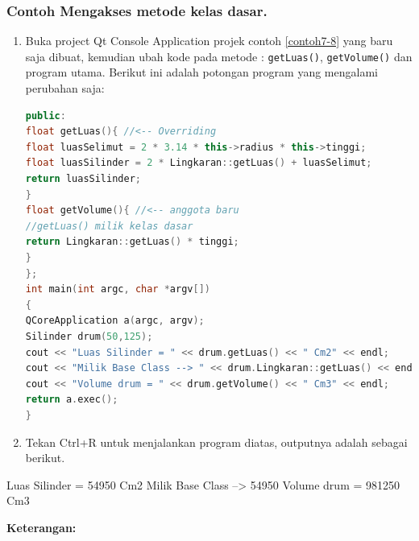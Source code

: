 \subsubsection*{Contoh  Mengakses metode kelas dasar.}

\begin{enumerate}

\item
  Buka project Qt Console Application projek contoh \ref{contoh7-8} yang baru saja
  dibuat, kemudian ubah kode pada metode : \texttt{getLuas()},
  \texttt{getVolume()} dan program utama. Berikut ini adalah potongan
  program yang mengalami perubahan saja:

\begin{lstlisting}[language=c++, caption=Mengakses metode kelas dasar, label=contoh7-8]
public:
float getLuas(){ //<-- Overriding
float luasSelimut = 2 * 3.14 * this->radius * this->tinggi;
float luasSilinder = 2 * Lingkaran::getLuas() + luasSelimut;
return luasSilinder;
}
float getVolume(){ //<-- anggota baru
//getLuas() milik kelas dasar
return Lingkaran::getLuas() * tinggi;
}
};
int main(int argc, char *argv[])
{
QCoreApplication a(argc, argv);
Silinder drum(50,125);
cout << "Luas Silinder = " << drum.getLuas() << " Cm2" << endl;
cout << "Milik Base Class --> " << drum.Lingkaran::getLuas() << endl;
cout << "Volume drum = " << drum.getVolume() << " Cm3" << endl;
return a.exec();
}
\end{lstlisting}
\item
  Tekan Ctrl+R untuk menjalankan program diatas, outputnya adalah
  sebagai berikut.
\end{enumerate}

\begin{lcverbatim}
Luas Silinder = 54950 Cm2
Milik Base Class --> 54950
Volume drum = 981250 Cm3
\end{lcverbatim}

\textbf{Keterangan:}

